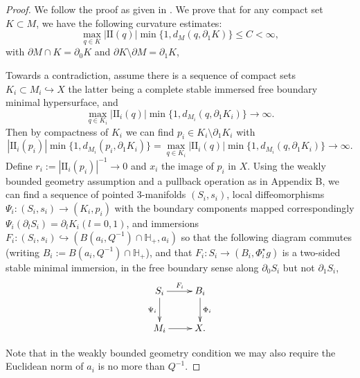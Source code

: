 \documentclass[12pt]{amsart}
\newcommand{\HH}{\mathbb{H}}
\newcommand{\sff}{\mathrm{I\!I}}
\newcommand{\p}{\partial}
\numberwithin{equation}{section}
\begin{document}
    \begin{proof}
        We follow the proof as given in \cite{ChodoLiStryk2022-CompleteStableMinimal}.
		We prove that for any compact set $K \subset M$, we have the following curvature estimates:
		\begin{equation}
			\max_{q\in K} |\sff(q)|\min\{1, d_M(q,\partial_1 K)\} \leq C <\infty,
		\end{equation}
		with $\p M \cap K= \p_0 K$ and $\p K \setminus \p M= \p_1 K$,

        Towards a contradiction, assume there is a sequence of compact sets $K_i \subset M_i \hookrightarrow X$ the latter being a complete stable  immersed free boundary minimal hypersurface, and \begin{equation}
            \max_{q\in K_i} |\sff_i(q)|\min\{1,d_{M_i}(q,\p_1 K_i)\} \rightarrow \infty.
        \end{equation}
        Then by compactness of $K_i$ we can find $p_i \in K_i \setminus \p_1 K_i$ with
        \begin{equation}
            |\sff_i(p_i)|\min\{1,d_{M_i}(p_i,\p_1 K_i)\}=\max_{q\in K_i} |\sff_i(q)|\min\{1,d_{M_i}(q,\p_1 K_i)\} \rightarrow \infty.
        \end{equation}
        Define $r_i:=|\sff_i(p_i)|^{-1}\rightarrow 0$ and $x_i$ the image of $p_i$ in $X$. Using the weakly bounded geometry assumption and a pullback operation as in \cite{ChodoLiStryk2022-CompleteStableMinimal} Appendix B, we can find a sequence of pointed 3-manifolds $(S_i,s_i)$, local diffeomorphisms $\Psi_i:(S_i,s_i) \rightarrow (K_i,p_i)$ with the boundary components mapped correspondingly $\Psi_i (\p_l S_i)= \p_l K_i (l=0,1)$, and immersions $F_i:(S_i,s_i)\hookrightarrow (B(a_i,Q^{-1})\cap \HH_+,a_i)$ so that the following diagram commutes (writing $B_i:=B(a_i,Q^{-1})\cap \HH_+$), and that $F_i:S_i \rightarrow (B_i,\Phi^{\star}_i g)$ is a two-sided stable minimal immersion, in the free boundary sense along $\p_0 S_i$ but not $\p_1 S_i$, 
		\[
		\xymatrix{
		S_{i} \ar[r]^{F_{i}} \ar[d]_{\Psi_{i}}& B_i\ar[d]^{\Phi_{i}}\\
		M_i \ar[r] & X.
		}
		\]
		
		Note that in the weakly bounded geometry condition we may also require the Euclidean norm of $a_i$ is no more than $Q^{-1}$.


\end{proof}
\end{document}
